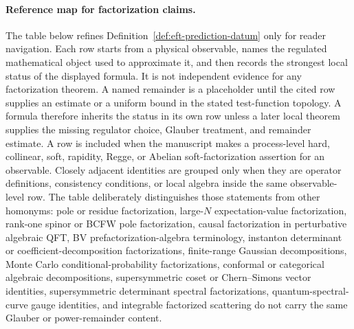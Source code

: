 \paragraph{Reference map for factorization claims.}
The table below refines Definition~\ref{def:eft-prediction-datum} only for
reader navigation.  Each row starts from a physical observable, names the
regulated mathematical object used to approximate it, and then records the
strongest local status of the displayed formula.  It is not independent
evidence for any factorization theorem.  A named remainder is a placeholder
until the cited row supplies an estimate or a uniform bound in the stated
test-function topology.  A formula therefore inherits the status in its own row
unless a later local theorem supplies the missing regulator choice, Glauber
treatment, and remainder estimate.
A row is included when the manuscript makes a process-level hard, collinear,
soft, rapidity, Regge, or Abelian soft-factorization assertion for an
observable.  Closely adjacent identities are grouped only when they are
operator definitions, consistency conditions, or local algebra inside the same
observable-level row.  The table deliberately distinguishes those statements
from other homonyms: pole or residue factorization, large-\(N\)
expectation-value factorization, rank-one spinor or BCFW pole factorization,
causal factorization in perturbative algebraic QFT, BV
prefactorization-algebra terminology, instanton determinant or
coefficient-decomposition factorizations, finite-range Gaussian
decompositions, Monte Carlo conditional-probability factorizations,
conformal or categorical algebraic decompositions, supersymmetric coset or
Chern--Simons vector identities, supersymmetric determinant spectral
factorizations, quantum-spectral-curve gauge identities, and integrable
factorized scattering do not carry the same Glauber or power-remainder content.

